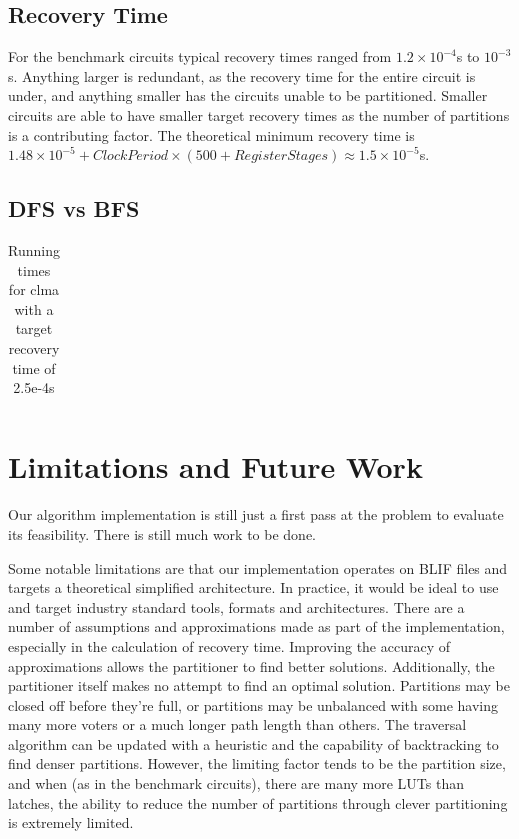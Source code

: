 \documentclass[12pt,final,oneside]{dwThesis} %
\begin{document}
   \section{Recovery Time}
    For the benchmark circuits typical recovery times ranged from $1.2\times10^{-4}$s to $10^{-3}$s. Anything larger is redundant, as the recovery time for the entire circuit is under, and anything smaller has the circuits unable to be partitioned. Smaller circuits are able to have smaller target recovery times as the number of partitions is a contributing factor.
    The theoretical minimum recovery time is $1.48\times10^{-5}+ClockPeriod\times(500+RegisterStages) \approx 1.5\times10^{-5}$s.


   \section{DFS vs BFS}\label{bfs}
   \begin{table}
   \begin{tabular}{lrrrrrr}

   	\bottomrule
   \end{tabular}
   \caption{Running times for clma with a target recovery time of 2.5e-4s}\label{runningtimes}
   \end{table}



   \chapter{Limitations and Future Work}
   Our algorithm implementation is still
   just a first pass at the problem to evaluate its feasibility. There is still
   much work to be done.

   Some notable limitations are that our implementation operates on \gls{BLIF}
   files and targets a theoretical simplified architecture. In practice, it
   would be ideal to use and target industry standard tools, formats and
   architectures.  There are a number of assumptions and approximations made as
   part of the implementation, especially in the calculation of recovery time.
   Improving the accuracy of approximations allows the partitioner to find
   better solutions. Additionally, the partitioner itself makes no attempt to
   find an optimal solution. Partitions may be closed off before they're full,
   or partitions may be unbalanced with some having many more voters or a much
   longer path length than others.  The traversal algorithm can be updated with
   a heuristic and the capability of backtracking to find denser partitions.
   However, the limiting factor tends to be the partition size, and when (as in
   the benchmark circuits), there are many more \glspl{LUT} than latches, the
   ability to reduce the number of partitions through clever partitioning is
   extremely limited.
   
\end{document}
